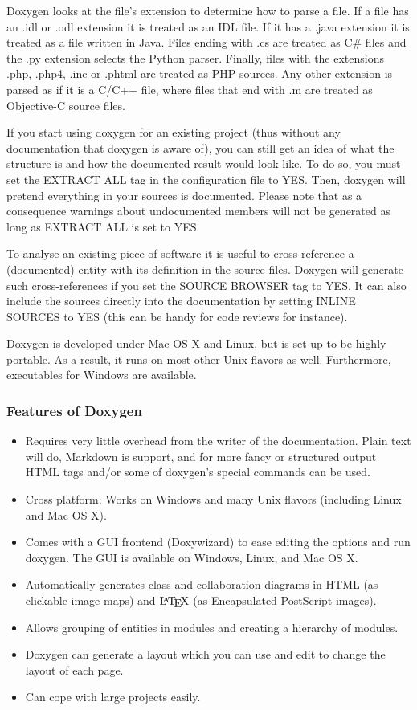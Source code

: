 Doxygen looks at the file’s extension to determine how to parse a file. If a file has an .idl or .odl extension it is treated as an IDL file. If it has a .java extension it is treated as a file written in Java. Files ending with .cs are treated as C\# files and the .py extension selects the Python parser. Finally, files with the extensions .php, .php4, .inc or .phtml are treated as PHP sources. Any other extension is parsed as if it is a C/C++ file, where files that end with .m are treated as Objective-C source files.

If you start using doxygen for an existing project (thus without any documentation that doxygen is aware of), you can still get an idea of what the structure is and how the documented result would look like. To do so, you must set the EXTRACT ALL tag in the configuration file to YES. Then, doxygen will pretend everything in your sources is documented. Please note that as a consequence warnings about undocumented members will not be generated as long as EXTRACT ALL is set to YES.

To analyse an existing piece of software it is useful to cross-reference a (documented) entity with its definition in the source files. Doxygen will generate such cross-references if you set the SOURCE BROWSER tag to YES. It can also include the sources directly into the documentation by setting INLINE SOURCES to YES (this can be handy for code reviews for instance).

Doxygen is developed under Mac OS X and Linux, but is set-up to be highly portable. As a result, it runs on most other Unix flavors as well. Furthermore, executables for Windows are available.

\subsubsection{Features of Doxygen}
\begin{itemize}
	\item Requires very little overhead from the writer of the documentation. 
	Plain text will do, Markdown is support, and for more fancy or structured 
	output HTML tags and/or some of doxygen's special commands can be used.
	\item Cross platform: Works on Windows and many Unix flavors (including 
	Linux and Mac OS X).
	\item Comes with a GUI frontend (Doxywizard) to ease editing the options 
	and run doxygen. The GUI is available on Windows, Linux, and Mac OS X.
	\item Automatically generates class and collaboration diagrams in HTML 
	(as clickable image maps) and $\mbox{\LaTeX}$ (as Encapsulated PostScript 
	images).
	\item Allows grouping of entities in modules and creating a hierarchy 
	of modules.
	\item Doxygen can generate a layout which you can use and edit to change 
	the layout of each page.
	\item Can cope with large projects easily.
\end{itemize}

